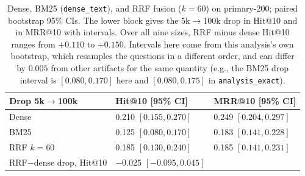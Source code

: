 \begin{table}[t]
\caption{Dense, BM25 (\texttt{dense\_text}), and RRF fusion ($k{=}60$) on primary-200; paired bootstrap 95\% CIs. The lower block gives the 5k$\to$100k drop in Hit@10 and in MRR@10 with intervals. Over all nine sizes, RRF minus dense Hit@10 ranges from $+0.110$ to $+0.150$. Intervals here come from this analysis's own bootstrap, which resamples the questions in a different order, and can differ by $0.005$ from other artifacts for the same quantity (e.g., the BM25 drop interval is $[0.080,0.170]$ here and $[0.080,0.175]$ in \texttt{analysis\_exact}).}
\label{tab:rrf}
\centering
\small
{}
\par\medskip
\begin{tabular}{lll}
\toprule
Drop 5k$\to$100k & Hit@10 [95\% CI] & MRR@10 [95\% CI] \\
\midrule
Dense & 0.210 $[0.155, 0.270]$ & 0.249 $[0.204, 0.297]$ \\
BM25 & 0.125 $[0.080, 0.170]$ & 0.183 $[0.141, 0.228]$ \\
RRF $k{=}60$ & 0.185 $[0.130, 0.240]$ & 0.185 $[0.141, 0.231]$ \\
RRF$-$dense drop, Hit@10 & $-$0.025 $[-0.095, 0.045]$ & \\
\bottomrule
\end{tabular}
\end{table}
